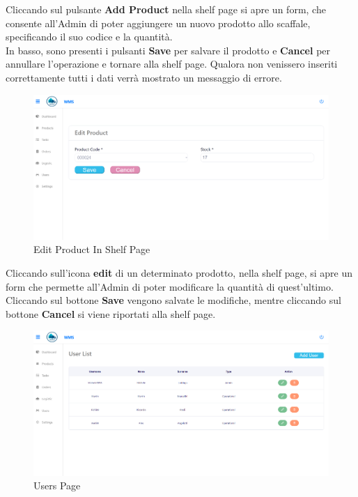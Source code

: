 Cliccando sul pulsante \textbf{Add Product} nella shelf page si apre un form, che consente
all'Admin di poter aggiungere un nuovo prodotto allo scaffale, specificando il suo codice e la quantità.\\
In basso, sono presenti i pulsanti \textbf{Save} per salvare il prodotto e \textbf{Cancel} per annullare l'operazione
e tornare alla shelf page.
Qualora non venissero inseriti correttamente tutti i dati verrà mostrato un messaggio di errore.

\begin{figure}[H]
    \centering
    \includegraphics[width=\textwidth]{document/sections/img/Storyboard/editProductInShelf.png}
    \caption{Edit Product In Shelf Page}
    \label{fig:editProductInShelfPage}
\end{figure}

Cliccando sull'icona \textbf{edit} di un determinato prodotto, nella shelf page, si apre un form
che permette all'Admin di poter modificare la quantità di quest'ultimo.\\
Cliccando sul bottone \textbf{Save} vengono salvate le modifiche, mentre cliccando sul bottone \textbf{Cancel} si viene
riportati alla shelf page.

\begin{figure}[H]
    \centering
    \includegraphics[width=\textwidth]{document/sections/img/Storyboard/usersPage.png}
    \caption{Users Page}
    \label{fig:viewUsersPage}
\end{figure}

